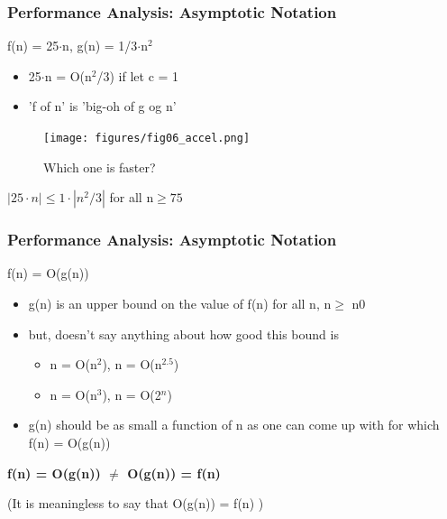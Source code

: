 \documentclass[newPxFont,sthlmFooter,nooffset]{beamer}
\begin{document}
\begin{frame}[t]
  \frametitle{Performance Analysis: Asymptotic Notation}
 f(n) = 25$\cdot$n, g(n) = 1/3$\cdot$n$^2$ 
\begin{itemize}
\item 25$\cdot$n = O(n$^2$/3) if let c = 1
\item 'f of n' is 'big-oh of g og n'
\end{itemize}

  \begin{figure}[h]
    \centering
    \texttt{[image: figures/fig06\_accel.png]}
    \caption{Which one is faster?}
  \end{figure}
$ |25\cdot n|  \leq 1\cdot|n^2/3|$ for all n$ \geq  75$
\end{frame}

\begin{frame}[t]
  \frametitle{Performance Analysis: Asymptotic Notation}
f(n) = O(g(n))
\begin{itemize}
\item g(n) is an upper bound on the value of f(n) for all n, n$\geq$ n0
\item  but, doesn’t say anything about how good this bound is
  \begin{itemize}
  \item n = O(n$^2$), n = O(n$^{2.5}$)
  \item n = O(n$^3$), n = O(2$^n$)
  \end{itemize}

\item g(n) should be as small a function
  of n as one can come up with for which f(n) = O(g(n))
\end{itemize}
\textbf{f(n) = O(g(n)) $\neq$  O(g(n)) = f(n)}

(It is meaningless to say that O(g(n)) = f(n) )
\end{frame}
\end{document}
